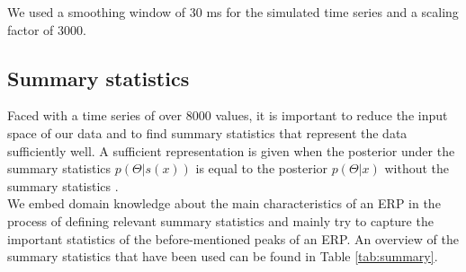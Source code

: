 \documentclass[12pt]{extreport}
\begin{document}


    


We used a smoothing window of 30 ms for the simulated time series and a scaling factor of 3000. 



\subsection{Summary statistics}
\label{sum_stat}

Faced with a time series of over 8000 values, it is important to reduce the input space of our data and to find summary statistics that represent the data sufficiently well. A sufficient representation is given when the posterior under the summary statistics $p(\Theta|s(x))$ is equal to the posterior $p(\Theta|x)$ without the summary statistics \citep{lueckmann2021benchmarking}.\\


We embed domain knowledge about the main characteristics of an ERP in the process of defining relevant summary statistics and mainly try to capture the important statistics of the before-mentioned peaks of an ERP. An overview of the summary statistics that have been used can be found in Table \ref{tab:summary}.\\
\end{document}
